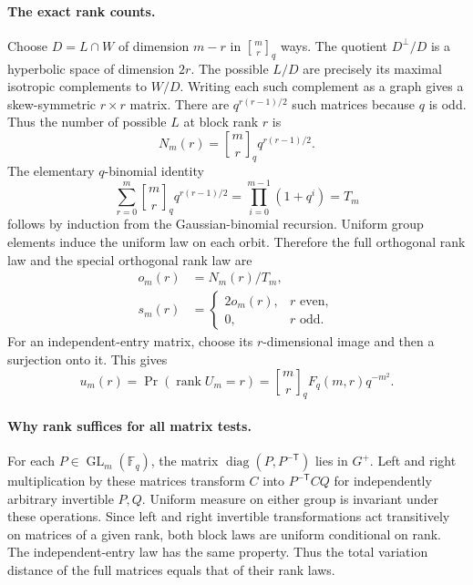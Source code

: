 \paragraph{The exact rank counts.}
Choose $D=L\cap W$ of dimension $m-r$ in ${m\brack r}_q$ ways.
The quotient $D^\perp/D$ is a hyperbolic space of dimension $2r$.
The possible $L/D$ are precisely its maximal isotropic complements to
$W/D$. Writing each such complement as a graph gives a skew-symmetric
$r\times r$ matrix. There are $q^{r(r-1)/2}$ such matrices because
$q$ is odd. Thus the number of possible $L$ at block rank $r$ is
\begin{equation}
 N_m(r)={m\brack r}_q q^{r(r-1)/2}.
 \label{eq:orthogonal-subspace-count}
\end{equation}
The elementary $q$-binomial identity
\[
 \sum_{r=0}^{m}{m\brack r}_q q^{r(r-1)/2}
   =\prod_{i=0}^{m-1}(1+q^i)=T_m
\]
follows by induction from the Gaussian-binomial recursion.
Uniform group elements induce the uniform law on each orbit. Therefore
the full orthogonal rank law and the special orthogonal rank law are
\begin{align}
 o_m(r)&=N_m(r)/T_m,\label{eq:O-rank-law}\\
 s_m(r)&=\begin{cases}2o_m(r),&r\text{ even},\\0,&r\text{ odd}.
                 \end{cases}\label{eq:SO-rank-law}
\end{align}
For an independent-entry matrix, choose its $r$-dimensional image and
then a surjection onto it. This gives
\begin{equation}
 u_m(r)=\Pr(\operatorname{rank}U_m=r)
       ={m\brack r}_qF_q(m,r)q^{-m^2}.
 \label{eq:iid-rank-law}
\end{equation}

\paragraph{Why rank suffices for all matrix tests.}
For each $P\in\operatorname{GL}_m(\mathbb F_q)$,
the matrix $\operatorname{diag}(P,P^{-\mathsf T})$ lies in $G^+$.
Left and right multiplication by these matrices transform $C$ into
$P^{-\mathsf T}CQ$ for independently arbitrary invertible $P,Q$.
Uniform measure on either group is invariant under these operations.
Since left and right invertible transformations act transitively on
matrices of a given rank, both block laws are uniform conditional on
rank. The independent-entry law has the same property. Thus the total
variation distance of the full matrices equals that of their rank laws.

